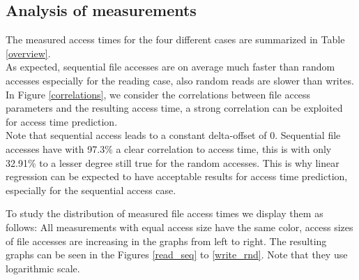 \documentclass{superfri}
\begin{document}
\subsection{Analysis of measurements}
\label{sec:measurements}
The measured access times for the four different cases are summarized in Table\,\ref{overview}.
\\
As expected, sequential file accesses are on average much faster than random accesses especially for the reading case, also random reads are slower than writes.\\
In Figure \ref{correlations}, we consider the correlations between file access parameters and the resulting access time, a strong correlation can be exploited for access time prediction.
\\
Note that sequential access leads to a constant delta-offset of $0$.
Sequential file accesses have with 97.3\% a clear correlation to access time, this is with only 32.91\% to a lesser degree still true for the random accesses.
This is why linear regression can be expected to have acceptable results for access time prediction, especially for the sequential access case.


\medskip

To study the distribution of measured file access times we display them as follows:
All measurements with equal access size have the same color, access sizes of file accesses are increasing in the graphs from left to right.
The resulting graphs can be seen in the Figures \ref{read_seq} to \ref{write_rnd}. Note that they use logarithmic scale.
\end{document}
